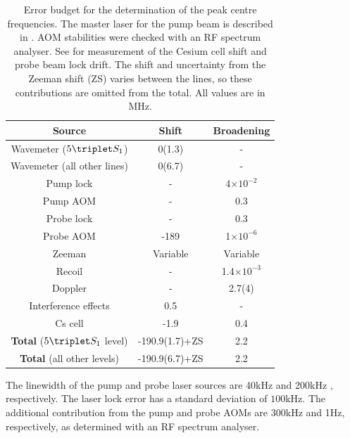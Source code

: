 \begin{table}
\centering
  \begin{tabular}{c c c}
      \hline\hline
          Source & Shift & Broadening  \\
      \hline
          Wavemeter ($5\triplet S_1$)& 0(1.3) & - \\
          Wavemeter (all other lines)& 0(6.7) & - \\
          Pump lock & - & 4$\times10^{-2}$ \\
          Pump AOM & - & 0.3 \\
          Probe lock & - & 0.3\\
          Probe AOM & -189 & 1$\times10^{-6}$\\
          Zeeman & Variable & Variable \\
          Recoil & - & 1.4$\times 10^{-3}$ \\ %
          Doppler & - & 2.7(4) \\
          Interference effects & 0.5 & - \\ 
          Cs cell & -1.9 & 0.4 \\
          \textbf{Total} ($5\triplet S_1$ level) & -190.9(1.7)+ZS& 2.2\\
          \textbf{Total} (all other levels) & -190.9(6.7)+ZS& 2.2\\
      \hline\hline
  \end{tabular}
\caption{Error budget for the determination of the peak centre frequencies.
	 The master laser for the pump beam is described in \cite{Shin16}.
	AOM stabilities were checked with an RF spectrum analyser.
	See \cite{Thomas20} for measurement of the Cesium cell shift and probe beam lock drift.
	The shift and uncertainty from the Zeeman shift (ZS) varies between the lines, so these contributions are omitted from the total.
	All values are in MHz.}
  \label{tab:errors}
  
\end{table}

	The linewidth of the pump and probe laser sources are 40kHz \cite{Shin16} and 200kHz \cite{Thomas20}, respectively.
	The laser lock error has a standard deviation of $100$kHz.
	The additional contribution from the pump and probe AOMs are 300kHz and 1Hz, respectively, as determined with an RF spectrum analyser.
	

